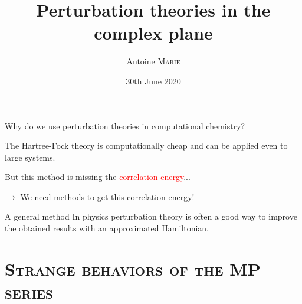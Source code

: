 \documentclass[xcolor=x11names,compress]{beamer}
\title[Title]{Perturbation theories in the complex plane}
\author[]{Antoine \textsc{Marie}}
\institute{Supervised by Pierre-François \textsc{LOOS}}
\renewcommand{\(}{\begin{columns}}
\renewcommand{\)}{\end{columns}}
\newcommand{\<}[1]{\begin{column}{#1}}
\renewcommand{\>}{\end{column}}
\begin{document}

\begin{frame}[plain]

\date{30th June 2020}
\titlepage
\end{frame}


\begin{frame}{Why do we use perturbation theories in computational chemistry?}

\pause[1]

The Hartree-Fock theory is \textcolor{Green4}{computationally cheap} and can be applied even to \textcolor{Green4}{large systems}.

But this method is missing the \textcolor{red}{correlation energy}...

\vspace{0.5cm}

\pause[2]

$\rightarrow$ We need methods to get this correlation energy! 

\vspace{0.5cm}

\pause[3]

\begin{beamerboxesrounded}[scheme=foncé]{\centering A general method}
In physics perturbation theory is often a good way to improve the obtained results with an approximated Hamiltonian.
\end{beamerboxesrounded}

    
\end{frame}

\section{\textsc{Strange behaviors of the MP series}}
\end{document}
